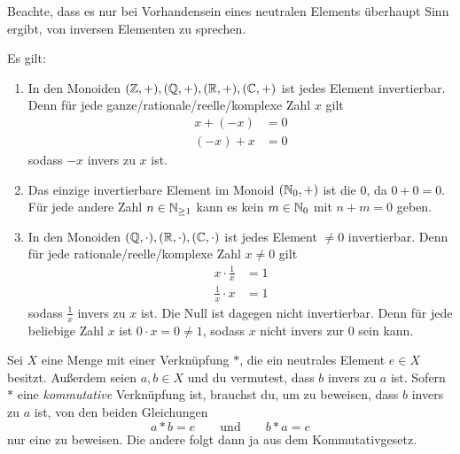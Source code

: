 \begin{bem}
    Beachte, dass es nur bei Vorhandensein eines neutralen Elements überhaupt Sinn ergibt, von inversen Elementen zu sprechen. 
\end{bem}


\begin{bsp} \label{bsp:inverse}
    Es gilt:
    \begin{enumerate}
        \item In den Monoiden $(\mathbb Z,+),(\mathbb Q,+),(\mathbb R,+),(\mathbb C,+)$ ist jedes Element invertierbar. Denn für jede ganze/rationale/reelle/komplexe Zahl $x$ gilt
        \begin{align*}
            x + (-x) & = 0 \\
            (-x) + x & = 0
        \end{align*}
        sodass $-x$ invers zu $x$ ist.
        \item Das einzige invertierbare Element im Monoid $(\mathbb N_0,+)$ ist die $0$, da $0+0=0$. Für jede andere Zahl $n\in \mathbb N_{\ge 1}$ kann es kein $m\in \mathbb N_0$ mit $n+m=0$ geben.
        \item In den Monoiden $(\mathbb Q,\cdot),(\mathbb R,\cdot),(\mathbb C,\cdot)$ ist jedes Element $\neq 0$ invertierbar. Denn für jede rationale/reelle/komplexe Zahl $x\neq 0$ gilt
        \begin{align*}
            x \cdot \frac{1}{x} & = 1 \\
            \frac{1}{x}\cdot x & = 1
        \end{align*}
        sodass $\frac{1}{x}$ invers zu $x$ ist. Die Null ist dagegen nicht invertierbar. Denn für jede beliebige Zahl $x$ ist $0\cdot x = 0\neq 1$, sodass $x$ nicht invers zur $0$ sein kann.
    \end{enumerate}
\end{bsp}

    
\begin{bem}
    Sei $X$ eine Menge mit einer Verknüpfung $*$, die ein neutrales Element $e\in X$ besitzt. Außerdem seien $a,b\in X$ und du vermutest, dass $b$ invers zu $a$ ist. Sofern $*$ eine \emph{kommutative} Verknüpfung ist, brauchst du, um zu beweisen, dass $b$ invers zu $a$ ist, von den beiden Gleichungen
        \[ a*b=e\qquad\text{und}\qquad b*a=e \]
    nur eine zu beweisen. Die andere folgt dann ja aus dem Kommutativgesetz.
\end{bem}


